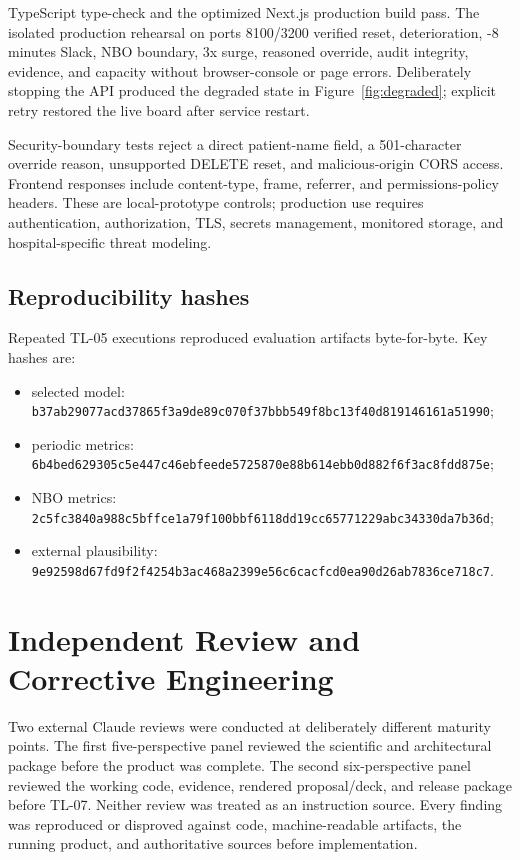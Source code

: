 \documentclass[11pt,a4paper]{article}
\newcommand{\code}[1]{\nolinkurl{#1}}
\begin{document}
TypeScript type-check and the optimized Next.js production build pass. The isolated production rehearsal on ports 8100/3200 verified reset, deterioration, -8 minutes Slack, NBO boundary, 3x surge, reasoned override, audit integrity, evidence, and capacity without browser-console or page errors. Deliberately stopping the API produced the degraded state in Figure~\ref{fig:degraded}; explicit retry restored the live board after service restart.

Security-boundary tests reject a direct patient-name field, a 501-character override reason, unsupported DELETE reset, and malicious-origin CORS access. Frontend responses include content-type, frame, referrer, and permissions-policy headers. These are local-prototype controls; production use requires authentication, authorization, TLS, secrets management, monitored storage, and hospital-specific threat modeling.

\subsection{Reproducibility hashes}

Repeated TL-05 executions reproduced evaluation artifacts byte-for-byte. Key hashes are:

\begin{itemize}
  \item selected model: \code{b37ab29077acd37865f3a9de89c070f37bbb549f8bc13f40d819146161a51990};
  \item periodic metrics: \code{6b4bed629305c5e447c46ebfeede5725870e88b614ebb0d882f6f3ac8fdd875e};
  \item NBO metrics: \code{2c5fc3840a988c5bffce1a79f100bbf6118dd19cc65771229abc34330da7b36d};
  \item external plausibility: \code{9e92598d67fd9f2f4254b3ac468a2399e56c6cacfcd0ea90d26ab7836ce718c7}.
\end{itemize}

\section{Independent Review and Corrective Engineering}

Two external Claude reviews were conducted at deliberately different maturity points. The first five-perspective panel reviewed the scientific and architectural package before the product was complete. The second six-perspective panel reviewed the working code, evidence, rendered proposal/deck, and release package before TL-07. Neither review was treated as an instruction source. Every finding was reproduced or disproved against code, machine-readable artifacts, the running product, and authoritative sources before implementation.
\end{document}
